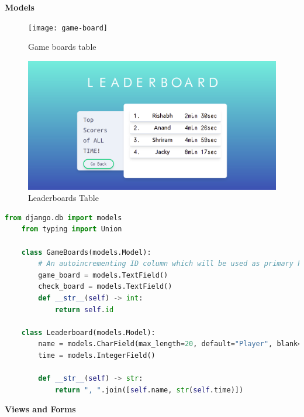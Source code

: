 \documentclass[12pt, a4paper]{report}
\begin{document}
    \textbf{Models}
    \begin{figure}[h!]
        \centering
        \texttt{[image: game-board]}
        \caption{Game boards table}
        \label{fig:game-boards}
    \end{figure}
    \begin{figure}[h!]
        \centering
        \includegraphics{leaderboard}
        \caption{Leaderboards Table}
        \label{fig:leaderboard}
    \end{figure}
    \begin{lstlisting}[language=Python, caption=mainapp/models.py]
    from django.db import models
    from typing import Union

    class GameBoards(models.Model):
        # An autoincrementing ID column which will be used as primary key is automatically added.
        game_board = models.TextField()
        check_board = models.TextField()
        def __str__(self) -> int:
            return self.id
    
    class Leaderboard(models.Model):
        name = models.CharField(max_length=20, default="Player", blank=False)
        time = models.IntegerField()
    
        def __str__(self) -> str: 
            return ", ".join([self.name, str(self.time)])
    \end{lstlisting}
    \textbf{Views and Forms}
\end{document}
